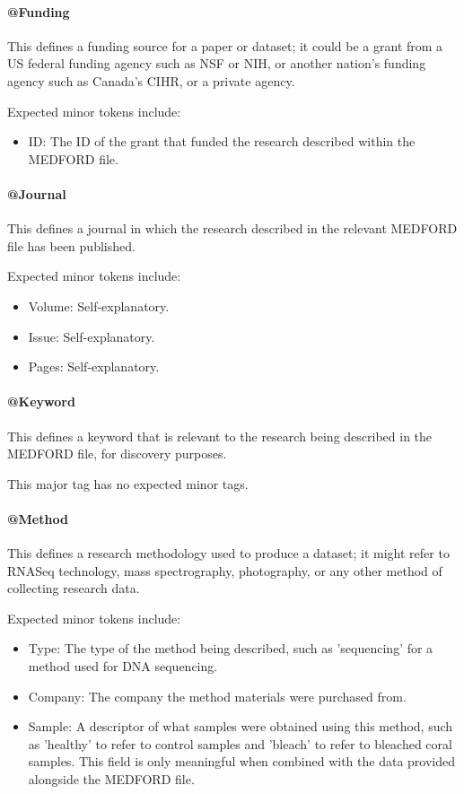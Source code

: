 \documentclass[10pt]{article}
\begin{document}
    \paragraph{@Funding}
    
    This defines a funding source for a paper or dataset; it could be a grant from a US federal funding agency such as NSF or NIH, or another nation's funding agency such as Canada's CIHR, or a private agency.
    
    Expected minor tokens include:
    \begin{itemize}
        \item ID: The ID of the grant that funded the research described within the MEDFORD file.
    \end{itemize}
    
    \paragraph{@Journal}
    
    This defines a journal in which the research described in the relevant MEDFORD file has been published.
    
    Expected minor tokens include:
    \begin{itemize}
        \item Volume: Self-explanatory.
        \item Issue: Self-explanatory.
        \item Pages: Self-explanatory.
    \end{itemize}
    
    \paragraph{@Keyword}
    
    This defines a keyword that is relevant to the research being described in the MEDFORD file, for discovery purposes.
    
    This major tag has no expected minor tags.
    
    \paragraph{@Method}
    
    This defines a research methodology used to produce a dataset; it might refer to RNASeq technology, mass spectrography, photography, or any other method of collecting research data.
    
    Expected minor tokens include:
    \begin{itemize}
        \item Type: The type of the method being described, such as 'sequencing' for a method used for DNA sequencing.
        \item Company: The company the method materials were purchased from.
        \item Sample: A descriptor of what samples were obtained using this method, such as 'healthy' to refer to control samples and 'bleach' to refer to bleached coral samples. This field is only meaningful when combined with the data provided alongside the MEDFORD file.
    \end{itemize}
    
\end{document}
